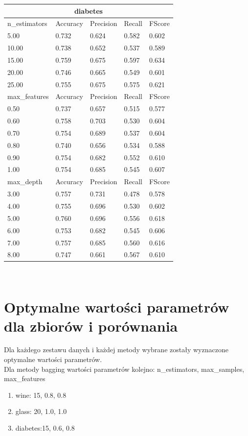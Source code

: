 \documentclass[12pt,a4paper]{article}
\begin{document}
\begin{tabular}{ |p{3cm}||p{2cm}|p{2cm}|p{2cm}|p{2cm}| }
\hline
\multicolumn{5}{|c|}{diabetes}\\
\hline
n\_estimators & Accuracy & Precision & Recall & FScore \\
\hline
5.00 & 0.732 & 0.624 & 0.582 & 0.602\\
10.00 & 0.738 & 0.652 & 0.537 & 0.589\\
15.00 & 0.759 & 0.675 & 0.597 & 0.634\\
20.00 & 0.746 & 0.665 & 0.549 & 0.601\\
25.00 & 0.755 & 0.675 & 0.575 & 0.621\\
\hline
max\_features & Accuracy & Precision & Recall & FScore \\
\hline
0.50 & 0.737 & 0.657 & 0.515 & 0.577\\
0.60 & 0.758 & 0.703 & 0.530 & 0.604\\
0.70 & 0.754 & 0.689 & 0.537 & 0.604\\
0.80 & 0.740 & 0.656 & 0.534 & 0.588\\
0.90 & 0.754 & 0.682 & 0.552 & 0.610\\
1.00 & 0.754 & 0.685 & 0.545 & 0.607\\
\hline
max\_depth & Accuracy & Precision & Recall & FScore \\
\hline
3.00 & 0.757 & 0.731 & 0.478 & 0.578\\
4.00 & 0.755 & 0.696 & 0.530 & 0.602\\
5.00 & 0.760 & 0.696 & 0.556 & 0.618\\
6.00 & 0.753 & 0.682 & 0.545 & 0.606\\
7.00 & 0.757 & 0.685 & 0.560 & 0.616\\
8.00 & 0.747 & 0.661 & 0.567 & 0.610\\
\hline
\end{tabular}
\\

\section{Optymalne wartości parametrów dla zbiorów i porównania}
Dla każdego zestawu danych i każdej metody wybrane zostały wyznaczone optymalne wartości parametrów. \\Dla metody bagging wartości parametrów kolejno: n\_estimators, max\_samples, max\_features

\begin{enumerate}
  \item wine: 15, 0.8, 0.8
  \item glass: 20, 1.0, 1.0
  \item diabetes:15, 0.6, 0.8
\end{enumerate}
\end{document}
